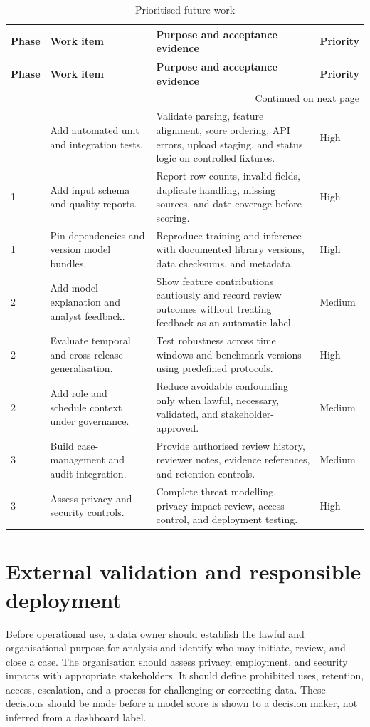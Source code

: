 \begin{longtable}{|p{}|p{}|p{}|p{}|}
\caption{Prioritised future work}\label{tab:future-work}\\
\hline
\textbf{Phase} & \textbf{Work item} & \textbf{Purpose and acceptance evidence} & \textbf{Priority}\\\hline
\endfirsthead
\hline
\textbf{Phase} & \textbf{Work item} & \textbf{Purpose and acceptance evidence} & \textbf{Priority}\\\hline
\endhead
\hline
\multicolumn{4}{r}{Continued on next page}\\
\endfoot
\hline
\endlastfoot
1 & Add automated unit and integration tests. & Validate parsing, feature alignment, score ordering, API errors, upload staging, and status logic on controlled fixtures. & High\\\hline
1 & Add input schema and quality reports. & Report row counts, invalid fields, duplicate handling, missing sources, and date coverage before scoring. & High\\\hline
1 & Pin dependencies and version model bundles. & Reproduce training and inference with documented library versions, data checksums, and metadata. & High\\\hline
2 & Add model explanation and analyst feedback. & Show feature contributions cautiously and record review outcomes without treating feedback as an automatic label. & Medium\\\hline
2 & Evaluate temporal and cross-release generalisation. & Test robustness across time windows and benchmark versions using predefined protocols. & High\\\hline
2 & Add role and schedule context under governance. & Reduce avoidable confounding only when lawful, necessary, validated, and stakeholder-approved. & Medium\\\hline
3 & Build case-management and audit integration. & Provide authorised review history, reviewer notes, evidence references, and retention controls. & Medium\\\hline
3 & Assess privacy and security controls. & Complete threat modelling, privacy impact review, access control, and deployment testing. & High\\\hline
\end{longtable}

\section{External validation and responsible deployment}
Before operational use, a data owner should establish the lawful and
organisational purpose for analysis and identify who may initiate,
review, and close a case. The organisation should assess privacy,
employment, and security impacts with appropriate stakeholders. It
should define prohibited uses, retention, access, escalation, and a
process for challenging or correcting data. These decisions should be
made before a model score is shown to a decision maker, not inferred
from a dashboard label.

